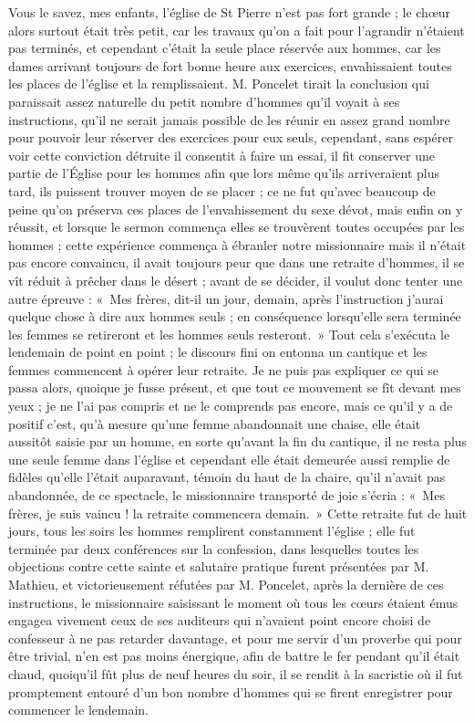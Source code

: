\documentclass[11pt,a4paper]{report}
\begin{document}
Vous le savez, mes enfants, l'église de St Pierre n'est pas fort grande ; le chœur alors surtout était très petit, car les travaux qu'on a fait pour l'agrandir n'étaient pas terminés, et cependant c'était la seule place réservée aux hommes, car les dames arrivant toujours de fort bonne heure aux exercices, envahissaient toutes les places de l'église et la remplissaient. M. Poncelet tirait la conclusion qui paraissait assez naturelle du petit nombre d'hommes qu'il voyait à ses instructions, qu'il ne serait jamais possible de les réunir en assez grand nombre pour pouvoir leur réserver des exercices pour eux seuls, cependant, sans espérer voir cette conviction détruite il consentit à faire un essai, il fit conserver une partie de l'Église pour les hommes afin que lors même qu'ils arriveraient plus tard, ils puissent trouver moyen de se placer ; ce ne fut qu'avec beaucoup de peine qu'on préserva ces places de l'envahissement du sexe dévot, mais enfin on y réussit, et lorsque le sermon commença elles se trouvèrent toutes occupées par les hommes ; cette expérience commença à ébranler notre missionnaire mais il n'était pas encore convaincu, il avait toujours peur que dans une retraite d'hommes, il se vît réduit à prêcher dans le désert ; avant de se décider, il voulut donc tenter une autre épreuve : «~Mes frères, dit-il un jour, demain, après l'instruction j'aurai quelque chose à dire aux hommes seuls ; en conséquence lorsqu'elle sera terminée les femmes se retireront et les hommes seuls resteront.~» Tout cela s'exécuta le lendemain de point en point ; le discours fini on entonna un cantique et les femmes commencent à opérer leur retraite. Je ne puis pas expliquer ce qui se passa alors, quoique je fusse présent, et que tout ce mouvement se fît devant mes yeux ; je ne l'ai pas compris et ne le comprends pas encore, mais ce qu'il y a de positif c'est, qu'à mesure qu'une femme abandonnait une chaise, elle était aussitôt saisie par un homme, en sorte qu'avant la fin du cantique, il ne resta plus une seule femme dans l'église et cependant elle était demeurée aussi remplie de fidèles qu'elle l'était auparavant, témoin du haut de la chaire, qu'il n'avait pas abandonnée, de ce spectacle, le missionnaire transporté de joie s'écria : «~Mes frères, je suis vaincu ! la retraite commencera demain.~» Cette retraite fut de huit jours, tous les soirs les hommes remplirent constamment l'église ; elle fut terminée par deux conférences sur la confession, dans lesquelles toutes les objections contre cette sainte et salutaire pratique furent présentées par M. Mathieu, et victorieusement réfutées par M. Poncelet, après la dernière de ces instructions, le missionnaire saisissant le moment où tous les cœurs étaient émus engagea vivement ceux de ses auditeurs qui n'avaient point encore choisi de confesseur à ne pas retarder davantage, et pour me servir d'un proverbe qui pour être trivial, n'en est pas moins énergique, afin de battre le fer pendant qu'il était chaud, quoiqu'il fût plus de neuf heures du soir, il se rendit à la sacristie où il fut promptement entouré d'un bon nombre d'hommes qui se firent enregistrer pour commencer le lendemain.
\end{document}
